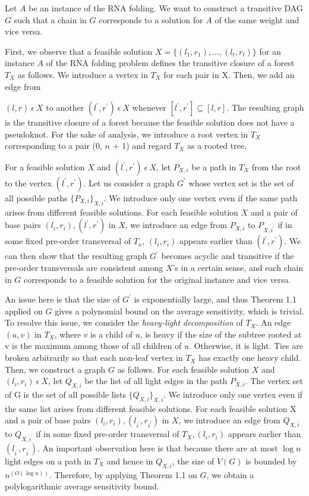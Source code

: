 \documentclass[preprint, 11pt]{article}
\begin{document}
Let $A$ be an instance of the RNA folding. We want to construct a transitive DAG $G$ such that
a chain in $G$ corresponds to a solution for $A$ of the same weight and vice versa.

First, we observe that a feasible solution $X = \{(l_1, r_1), \ldots, (l_t, r_t)\}$ for an instance $A$ of the
RNA folding problem defines the transitive closure of a forest $T_X$ as follows. We introduce a
vertex in $T_X$ for each pair in X. Then, we add an edge from

$(l, r) \ \epsilon \ X$ to another $(l^{'}, r^{'}) \ \epsilon \ X$ whenever $[l^{'}, r^{'}] \subseteq [l, r]$. The resulting graph is the transitive closure of a forest because the feasible
solution does not have a pseudoknot. For the sake of analysis, we introduce a root vertex in $T_X$
corresponding to a pair (0, $n$ + 1) and regard $T_X$ as a rooted tree.

For a feasible solution $X$ and $(l^{'}, r^{'}) \ \epsilon \ X$, let $P_{X,i}$ be a path in $T_X$ from the root to the vertex $(l^{'}, r^{'})$. Let us consider a graph $G^'$ whose vertex set is the set of all possible paths $\{P_{X,i}\}_{X,i}$.  We
introduce only one vertex even if the same path arises from different feasible solutions. For each
feasible solution $X$ and a pair of base pairs $(l_i, r_i), (l^{'}, r^{'})$ in $X$, we introduce an edge from $P_{X,i}$ to 
$P_{X,i^{'}}$ if in some fixed pre-order transversal of $T_x$, $(l_i, r_i)$ appears earlier than $(l^{'}, r^{'})$. We can
then show that the resulting graph $G^'$ becomes acyclic and transitive if the pre-order transversals
are consistent among $X$’s in a certain sense, and each chain in $G$ corresponds to a feasible solution
for the original instance and vice versa.

An issue here is that the size of $G^'$
is exponentially large, and thus Theorem 1.1 applied on
$G$ gives a polynomial bound on the average sensitivity, which is trivial. To resolve this issue, we
consider the \textit{heavy-light decomposition} of $T_X$. An edge $(u, v)$ in $T_X$, where $v$ is a child of $u$, is heavy
if the size of the subtree rooted at v is the maximum among those of all children of $u$. Otherwise,
it is light. Ties are broken arbitrarily so that each non-leaf vertex in $T_X$ has exactly one heavy
child. Then, we construct a graph $G$ as follows. For each feasible solution $X$ and $(l_i, r_i) \ \epsilon \ X$, let $Q_{X,i}$ be the list of all light edges in the path $P_{X,i}$. The vertex set of G is the set of all possible
lists $\{Q_{X,i}\}_{X,i}$. We introduce only one vertex even if the same list arises from different feasible
solutions. For each feasible solution X and a pair of base pairs $(l_i,r_i), (l_{i^{'}},r_{i^{'}})$ in $X$, we introduce
an edge from $Q_{X,i}$ to $Q_{X,i^{'}}$ if in some fixed pre-order transversal of $T_X, (l_i, r_i)$ appears earlier than $(l_{i^{'}},r_{i^{'}})$. An important observation here is that because there are at most $\log n$ light edges on a
path in $T_X$ and hence in $Q_{X,i}$, the size of $V(G)$ is bounded by $n^(O(\log n))$. Therefore, by applying
Theorem 1.1 on $G$, we obtain a polylogarithmic average sensitivity bound.
\end{document}
